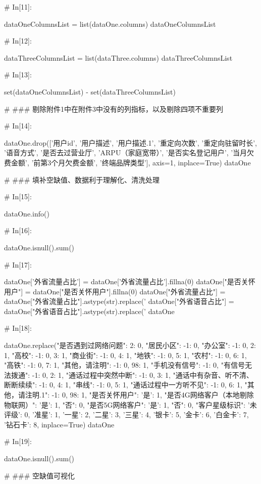 \documentclass{MathorCupmodeling}
\begin{document}
\begin{python}
	# In[11]:
	
	
	dataOneColumnsList = list(dataOne.columns)
	dataOneColumnsList
	
	# In[12]:
	
	
	dataThreeColumnsList = list(dataThree.columns)
	dataThreeColumnsList
	
	# In[13]:
	
	
	set(dataOneColumnsList) - set(dataThreeColumnsList)
	
	# ### 剔除附件1中在附件3中没有的列指标，以及剔除四项不重要列
	
	# In[14]:
	
	
	dataOne.drop(['用户id', '用户描述', '用户描述.1', '重定向次数', '重定向驻留时长', '语音方式', '是否去过营业厅', 'ARPU（家庭宽带）', '是否实名登记用户', '当月欠费金额', '前第3个月欠费金额', '终端品牌类型'], axis=1, inplace=True)
	dataOne
	
	# ### 填补空缺值、数据利于理解化、清洗处理
	
	# In[15]:
	
	
	dataOne.info()
	
	# In[16]:
	
	
	dataOne.isnull().sum()
	
	# In[17]:
	
	
	dataOne['外省流量占比'] = dataOne['外省流量占比'].fillna(0)
	dataOne["是否关怀用户"] = dataOne["是否关怀用户"].fillna(0)
	dataOne["外省流量占比"] = dataOne["外省流量占比"].astype(str).replace('%
	dataOne["外省语音占比"] = dataOne["外省语音占比"].astype(str).replace('%
	dataOne
	
	# In[18]:
	
	
	dataOne.replace({"是否遇到过网络问题": {2: 0}, "居民小区": {-1: 0}, "办公室": {-1: 0, 2: 1}, "高校": {-1: 0, 3: 1}, "商业街": {-1: 0, 4: 1}, "地铁": {-1: 0, 5: 1}, "农村": {-1: 0, 6: 1}, "高铁": {-1: 0, 7: 1}, "其他，请注明": {-1: 0, 98: 1}, "手机没有信号": {-1: 0}, "有信号无法拨通": {-1: 0, 2: 1}, "通话过程中突然中断": {-1: 0, 3: 1}, "通话中有杂音、听不清、断断续续": {-1: 0, 4: 1}, "串线": {-1: 0, 5: 1}, "通话过程中一方听不见": {-1: 0, 6: 1}, "其他，请注明.1": {-1: 0, 98: 1}, "是否关怀用户": {'是': 1}, "是否4G网络客户（本地剔除物联网）": {'是': 1, "否": 0}, "是否5G网络客户": {'是': 1, "否": 0}, "客户星级标识": {'未评级': 0, '准星': 1, '一星': 2, '二星': 3, '三星': 4, '银卡': 5, '金卡': 6, '白金卡': 7, '钻石卡': 8}}, inplace=True)
	dataOne
	
	# In[19]:
	
	
	dataOne.isnull().sum()
	
	# ### 空缺值可视化
	

\end{python}
\end{document}
